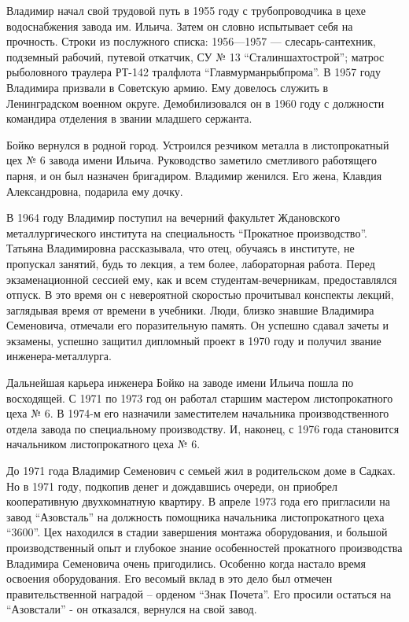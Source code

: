 Владимир начал свой трудовой путь в 1955 году с трубопроводчика в цехе
водоснабжения завода им. Ильича. Затем он словно испытывает себя на прочность.
Строки из послужного списка: 1956—1957 — слесарь-сантехник, подземный рабочий,
путевой откатчик, СУ № 13 \enquote{Сталиншахтострой}; матрос рыболовного траулера
РТ-142 тралфлота \enquote{Главмурманрыбпрома}. В 1957 году Владимира призвали в
Советскую армию. Ему довелось служить в Ленинградском военном округе.
Демобилизовался он в 1960 году с должности командира отделения в звании
младшего сержанта.

Бойко вернулся в родной город. Устроился резчиком металла в листопрокатный цех
№ 6 завода имени Ильича. Руководство заметило сметливого работящего парня, и он
был назначен бригадиром. Владимир женился. Его жена, Клавдия Александровна,
подарила ему дочку.

В 1964 году Владимир поступил на вечерний факультет Ждановского
металлургического института на специальность \enquote{Прокатное производство}. Татьяна
Владимировна рассказывала, что отец, обучаясь в институте, не пропускал
занятий, будь то лекция, а тем более, лабораторная работа. Перед
экзаменационной сессией ему, как и всем студентам-вечерникам, предоставлялся
отпуск. В это время он с невероятной скоростью прочитывал конспекты лекций,
заглядывая время от времени в учебники. Люди, близко знавшие Владимира
Семеновича, отмечали его поразительную память. Он успешно сдавал зачеты и
экзамены, успешно защитил дипломный проект в 1970 году и получил звание
инженера-металлурга.

Дальнейшая карьера инженера Бойко на заводе имени Ильича пошла по восходящей. С
1971 по 1973 год  он работал старшим мастером листопрокатного цеха № 6. В
1974-м его назначили  заместителем начальника производственного отдела завода
по специальному производству. И, наконец, с 1976 года становится начальником
листопрокатного цеха № 6.

До 1971 года Владимир Семенович с семьей жил в родительском доме в Садках. Но в
1971 году, подкопив денег и дождавшись очереди, он приобрел кооперативную
двухкомнатную квартиру. В апреле 1973 года его пригласили на завод \enquote{Азовсталь}
на должность помощника начальника листопрокатного цеха \enquote{3600}. Цех находился в
стадии завершения монтажа оборудования, и большой производственный опыт и
глубокое знание особенностей прокатного производства Владимира Семеновича очень
пригодились. Особенно когда настало время освоения оборудования. Его весомый
вклад в это дело был отмечен правительственной наградой – орденом \enquote{Знак
Почета}. Его просили остаться на \enquote{Азовстали} - он отказался, вернулся на свой
завод.

